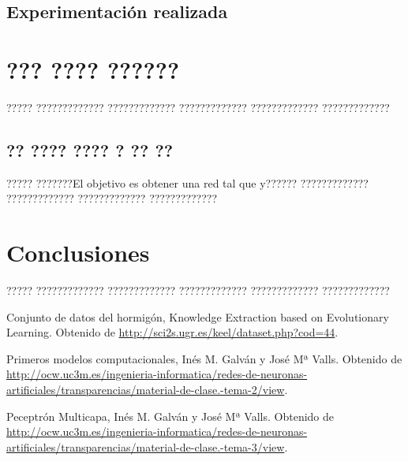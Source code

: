 \documentclass[11pt,spanish,listoffigures,listoftables]{tfgetsinf}
\begin{document}
\section{Experimentación realizada}


\chapter{??? ???? ??????}

????? ????????????? ????????????? ????????????? ????????????? ????????????? 

\section{?? ???? ???? ? ?? ??}

????? ???????El objetivo es obtener una red tal que y?????? ????????????? ????????????? ????????????? ?????????????


\chapter{Conclusiones}

????? ????????????? ????????????? ????????????? ????????????? ????????????? 


\begin{thebibliography}{10}


   Conjunto de datos del hormigón, 
   \newblock Knowledge Extraction based on Evolutionary Learning. 
   \newblock Obtenido de
   \url{http://sci2s.ugr.es/keel/dataset.php?cod=44}.

   Primeros modelos computacionales, 
   \newblock Inés M. Galván y José Mª Valls.
   \newblock Obtenido de
   \url{http://ocw.uc3m.es/ingenieria-informatica/redes-de-neuronas-artificiales/transparencias/material-de-clase.-tema-2/view}.

   Peceptrón Multicapa, 
   \newblock Inés M. Galván y José Mª Valls.
   \newblock Obtenido de
   \url{http://ocw.uc3m.es/ingenieria-informatica/redes-de-neuronas-artificiales/transparencias/material-de-clase.-tema-3/view}.

\end{thebibliography}
\cleardoublepage

\end{document}
